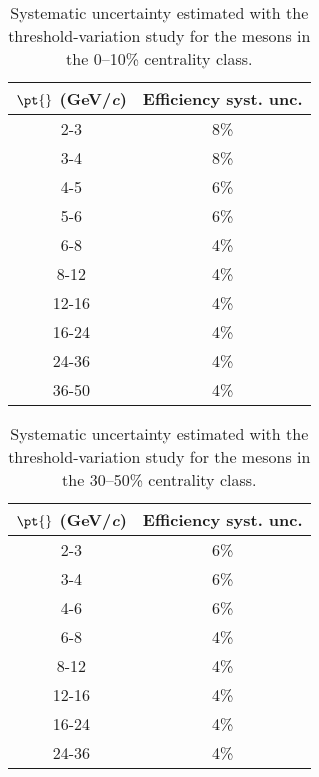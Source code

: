 \begin{table}[htbp]
  \begin{center}
   \begin{tabular}{|c|c|}
    \hline
    \textbf{$\mathbf{\pt{}}$ (GeV/\textit{c})} & \textbf{Efficiency syst. unc.} \\
    \hline
    2-3 & 8\%\\
    \hline
    3-4 & 8\%\\
    \hline
    4-5 & 6\%\\
    \hline
    5-6 & 6\%\\
    \hline
    6-8 & 4\%\\
    \hline
    8-12 & 4\%\\
    \hline
    12-16 & 4\%\\
    \hline
    16-24 & 4\%\\
    \hline
    24-36 & 4\%\\
    \hline
    36-50 & 4\%\\ 
    \hline
   \end{tabular}
  \end{center}
  \caption{Systematic uncertainty estimated with the threshold-variation study for the \Dsubs{} mesons in the 0--10\% centrality class.}
  \label{tab:DsEffSyst010_ml}
\end{table}
\begin{table}[htbp]
  \begin{center}
   \begin{tabular}{|c|c|}
    \hline
    \textbf{$\mathbf{\pt{}}$ (GeV/\textit{c})} & \textbf{Efficiency syst. unc.} \\
    \hline
    2-3 & 6\%\\
    \hline
    3-4 & 6\%\\
    \hline
    4-6 & 6\%\\
    \hline
    6-8 & 4\%\\
    \hline
    8-12 & 4\%\\
    \hline
    12-16 & 4\%\\
    \hline
    16-24 & 4\%\\
    \hline
    24-36 & 4\%\\
    \hline
   \end{tabular}
  \end{center}
  \caption{Systematic uncertainty estimated with the threshold-variation study for the \Dsubs{} mesons in the 30--50\% centrality class.}
  \label{tab:DsEffSyst3050_ml}
\end{table}

 \clearpage

